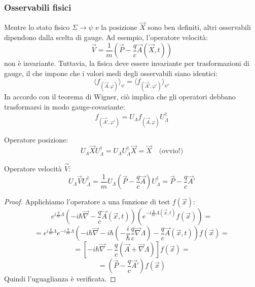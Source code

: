 \subsubsection{Osservabili fisici}

Mentre lo stato fisico \(\Sigma \to \psi\) e la posizione \(\vec{X}\) sono ben definiti, altri osservabili dipendono dalla scelta di gauge. Ad esempio, l'operatore velocità:
\[
\vec{V} = \frac{1}{m} \left( \vec{P} - \frac{q}{c} \vec{A}(\vec{X}, t) \right)
\]
non è invariante. Tuttavia, la fisica deve essere invariante per trasformazioni di gauge, il che impone che i valori medi degli osservabili siano identici:
\[
\langle f_{(\vec{A}, \varphi)} \rangle_\psi = \langle f_{(\vec{A}', \varphi')} \rangle_{\psi'}
\]
In accordo con il teorema di Wigner, ciò implica che gli operatori debbano trasformarsi in modo gauge-covariante:
\begin{equation}
    f_{(\vec{A}', \varphi')} = U_\Lambda f_{(\vec{A}, \varphi)} U_\Lambda^\dagger
\end{equation}

\begin{example}Operatore posizione:
        \[ U_{\Lambda} \vec{X} U_{\Lambda}^{\dagger} = U_{\Lambda} U_{\Lambda}^{\dagger} \vec{X} = \vec{X} \quad \text{(ovvio!)} \]
\end{example}
\begin{example}Operatore velocità \( \vec{V} \):
        \[ U_{\Lambda} \vec{V} U_{\Lambda}^{\dagger} = \frac{1}{m} U_{\Lambda} \left( \vec{P} - \frac{q}{c} \vec{A} \right) U_{\Lambda}^{\dagger} = \vec{P} - \frac{q}{c} \vec{A}' \]
\end{example}

\begin{proof}
    Applichiamo l'operatore a una funzione di test \( f(\vec{x}) \):
    \[ e^{i\frac{q}{\hbar c} \Lambda} \left( -i\hbar\vec{\nabla} - \frac{q}{c} \vec{A}(\vec{x},t) \right) \left( e^{-i\frac{q}{\hbar c} \Lambda(\vec{x},t)} f(\vec{x}) \right) = \]
    \[ = e^{i\frac{q}{\hbar c} \Lambda} e^{-i\frac{q}{\hbar c} \Lambda} \left( -i\hbar\vec{\nabla} - i\hbar \left( -\frac{i}{\hbar} \frac{q}{c} \vec{\nabla}\Lambda \right) - \frac{q}{c} \vec{A}(\vec{x},t) \right) f(\vec{x}) = \]
    \[ = \left[ -i\hbar\vec{\nabla} - \frac{q}{c} \left( \vec{A} + \vec{\nabla}\Lambda \right) \right] f(\vec{x}) = \]
    \[ = \left( \vec{P} - \frac{q}{c} \vec{A}' \right) f(\vec{x}) \]
    Quindi l'uguaglianza è verificata.
\end{proof}

